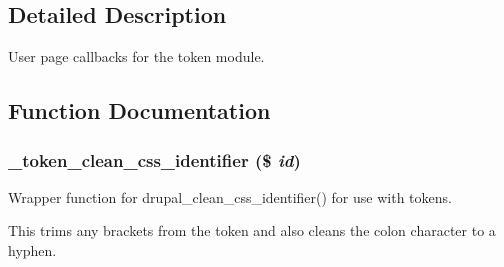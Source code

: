 \subsection{Detailed Description}
User page callbacks for the token module. 

\subsection{Function Documentation}
\hypertarget{token_8pages_8inc_ae945ed316363ca5b9c9b56c6554c493c}{
\subsubsection[{\_\-token\_\-clean\_\-css\_\-identifier}]{\setlength{\rightskip}{0pt plus 5cm}\_\-token\_\-clean\_\-css\_\-identifier (\$ {\em id})}}
\label{token_8pages_8inc_ae945ed316363ca5b9c9b56c6554c493c}
Wrapper function for drupal\_\-clean\_\-css\_\-identifier() for use with tokens.

This trims any brackets from the token and also cleans the colon character to a hyphen.

